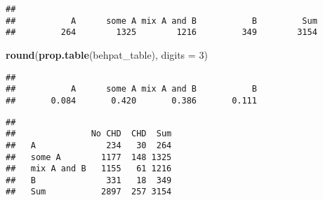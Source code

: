 \documentclass[]{article}
\newenvironment{Shaded}{\begin{snugshade}}{\end{snugshade}}
\newcommand{\CommentTok}[1]{\textcolor[rgb]{0.56,0.35,0.01}{\textit{#1}}}
\newcommand{\DataTypeTok}[1]{\textcolor[rgb]{0.13,0.29,0.53}{#1}}
\newcommand{\DecValTok}[1]{\textcolor[rgb]{0.00,0.00,0.81}{#1}}
\newcommand{\KeywordTok}[1]{\textcolor[rgb]{0.13,0.29,0.53}{\textbf{#1}}}
\newcommand{\NormalTok}[1]{#1}
\newcommand{\OperatorTok}[1]{\textcolor[rgb]{0.81,0.36,0.00}{\textbf{#1}}}
\newcommand{\StringTok}[1]{\textcolor[rgb]{0.31,0.60,0.02}{#1}}
\begin{document}
\begin{Shaded}
\end{Shaded}

\begin{verbatim}
## 
##           A      some A mix A and B           B         Sum 
##         264        1325        1216         349        3154
\end{verbatim}

\begin{Shaded}
\begin{Highlighting}[]
\KeywordTok{round}\NormalTok{(}\KeywordTok{prop.table}\NormalTok{(behpat_table), }\DataTypeTok{digits =} \DecValTok{3}\NormalTok{)}
\end{Highlighting}
\end{Shaded}

\begin{verbatim}
## 
##           A      some A mix A and B           B 
##       0.084       0.420       0.386       0.111
\end{verbatim}

\begin{Shaded}
\end{Shaded}

\begin{verbatim}
##              
##               No CHD  CHD  Sum
##   A              234   30  264
##   some A        1177  148 1325
##   mix A and B   1155   61 1216
##   B              331   18  349
##   Sum           2897  257 3154
\end{verbatim}
\end{document}
